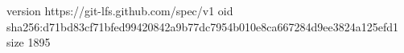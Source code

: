 version https://git-lfs.github.com/spec/v1
oid sha256:d71bd83cf71bfed99420842a9b77dc7954b010e8ca667284d9ee3824a125efd1
size 1895
